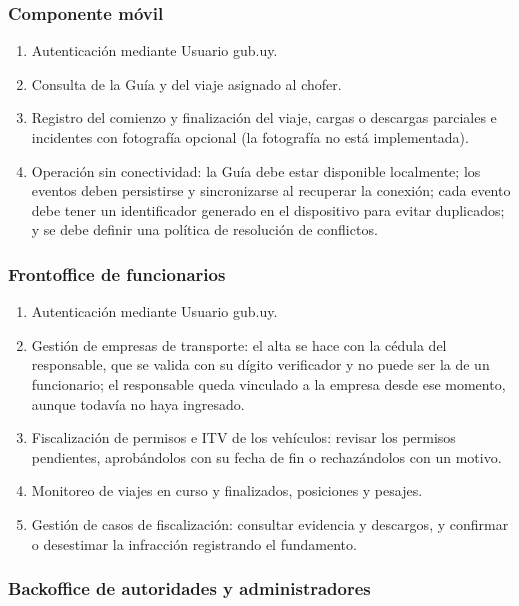 \subsubsection{Componente móvil}

\begin{enumerate}
    \item Autenticación mediante Usuario gub.uy.
    \item Consulta de la Guía y del viaje asignado al chofer.
    \item Registro del comienzo y finalización del viaje, cargas o descargas parciales e incidentes con fotografía opcional (la fotografía no está implementada).
    \item Operación sin conectividad: la Guía debe estar disponible localmente; los eventos deben persistirse y sincronizarse al recuperar la conexión; cada evento debe tener un identificador generado en el dispositivo para evitar duplicados; y se debe definir una política de resolución de conflictos.
\end{enumerate}

\subsubsection{Frontoffice de funcionarios}

\begin{enumerate}
    \item Autenticación mediante Usuario gub.uy.
    \item Gestión de empresas de transporte: el alta se hace con la cédula del responsable, que se valida con su dígito verificador y no puede ser la de un funcionario; el responsable queda vinculado a la empresa desde ese momento, aunque todavía no haya ingresado.
    \item Fiscalización de permisos e ITV de los vehículos: revisar los permisos pendientes, aprobándolos con su fecha de fin o rechazándolos con un motivo.
    \item Monitoreo de viajes en curso y finalizados, posiciones y pesajes.
    \item Gestión de casos de fiscalización: consultar evidencia y descargos, y confirmar o desestimar la infracción registrando el fundamento.
\end{enumerate}

\subsubsection{Backoffice de autoridades y administradores}

